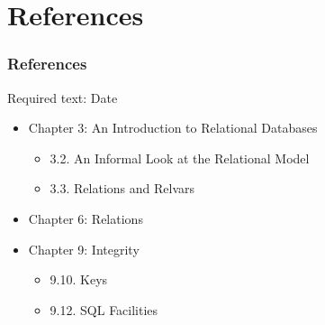 \documentclass[dvipsnames]{beamer}
\theoremstyle{plain}
\begin{document}
\section*{References}

\begin{frame}
  \frametitle{References}

  \begin{block}{Required text: Date}
    \begin{itemize}
      \item Chapter 3: An Introduction to Relational Databases
      \begin{itemize}
        \item 3.2. \alert{An Informal Look at the Relational Model}
        \item 3.3. \alert{Relations and Relvars}
      \end{itemize}

      \item Chapter 6: \alert{Relations}

      \item Chapter 9: Integrity
      \begin{itemize}
        \item 9.10. \alert{Keys}
        \item 9.12. \alert{SQL Facilities}
      \end{itemize}
    \end{itemize}
  \end{block}
\end{frame}
\end{document}
